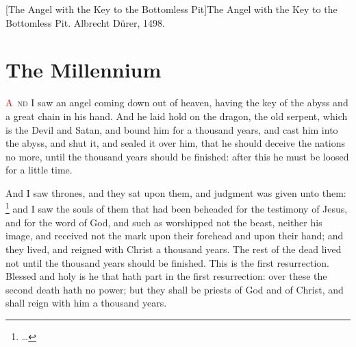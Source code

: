 [The Angel with the Key to the Bottomless Pit]{The Angel with the Key to the Bottomless Pit. Albrecht Dürer, 1498.}

\chapter{The Millennium}
\lettrine[lines=3,slope=0.5em]{\textcolor{red}{A}}{\ nd} I saw an angel coming down out of heaven, having the key of the abyss and a great chain in his hand. 
And he laid hold on the dragon, the old serpent, which is the Devil and Satan, and bound him for a thousand years, 
and cast him into the abyss, and shut it,%
 and sealed it over him, that he should deceive the nations no more, until the thousand years should be finished: after this he must be loosed for a little time.

And I saw thrones, and they sat upon them, and judgment was given unto them:%
	\footnote{\ldots %
			  } %
 and I saw the souls of them that had been beheaded for the testimony of Jesus, and for the word of God, and such as worshipped not the beast, neither his image, and received not the mark upon their forehead and upon their hand; and they lived,%
 and reigned with Christ a thousand years.%
The rest of the dead lived not until the thousand years should be finished. This is the first resurrection. 
Blessed and holy is he that hath part in the first resurrection: over these the second death hath no power; but they shall be priests of God and of Christ, and shall reign with him a thousand years.

